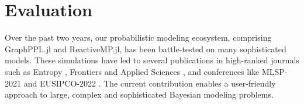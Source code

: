 \documentclass{juliacon}
\begin{document}
\section{Evaluation}

Over the past two years, our probabilistic modeling ecosystem, comprising GraphPPL.jl and ReactiveMP.jl, has been battle-tested on many sophisticated models. These simulations have led to several publications in high-ranked journals such as Entropy \cite{podusenko_message_2021}, Frontiers \cite{podusenko_aida_2022} and Applied Sciences \cite{van_erp_bayesian_2021}, and conferences like MLSP-2021 \cite{podusenko_message_2021_mslp} and EUSIPCO-2022 \cite{podusenko_message_2022_eusipco}. The current contribution enables a user-friendly approach to large, complex and sophisticated Bayesian modeling problems. 


\end{document}
